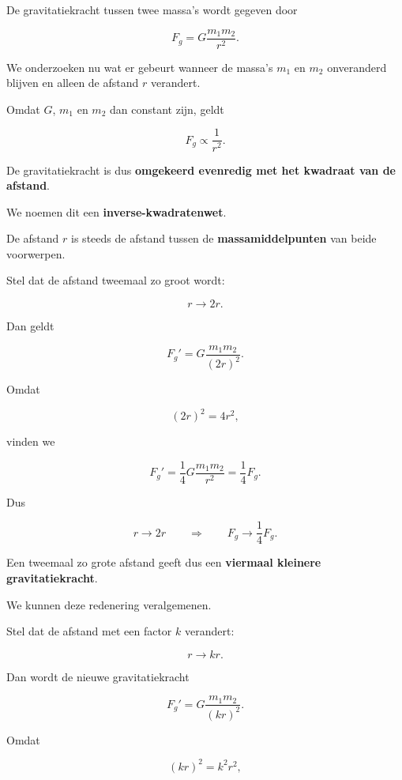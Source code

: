 \documentclass{ximera}
\begin{document}

De gravitatiekracht tussen twee massa's wordt gegeven door

\[
F_g
=
G\frac{m_1m_2}{r^2}.
\]

We onderzoeken nu wat er gebeurt wanneer de massa's $m_1$ en $m_2$
onveranderd blijven en alleen de afstand $r$ verandert.

Omdat $G$, $m_1$ en $m_2$ dan constant zijn, geldt

\[
\boxed{
F_g\propto\frac{1}{r^2}.
}
\]

De gravitatiekracht is dus \textbf{omgekeerd evenredig met het
kwadraat van de afstand}.

We noemen dit een \textbf{inverse-kwadratenwet}.

\begin{opmerking}
De afstand $r$ is steeds de afstand tussen de
\textbf{massamiddelpunten} van beide voorwerpen.
\end{opmerking}



Stel dat de afstand tweemaal zo groot wordt:

\[
r\longrightarrow2r.
\]

Dan geldt

\[
F_g'
=
G\frac{m_1m_2}{(2r)^2}.
\]

Omdat

\[
(2r)^2=4r^2,
\]

vinden we

\[
F_g'
=
\frac14
G\frac{m_1m_2}{r^2}
=
\frac14F_g.
\]

Dus

\[
\boxed{
r\longrightarrow2r
\qquad\Longrightarrow\qquad
F_g\longrightarrow\frac14F_g.
}
\]

Een tweemaal zo grote afstand geeft dus een
\textbf{viermaal kleinere gravitatiekracht}.



We kunnen deze redenering veralgemenen.

Stel dat de afstand met een factor $k$ verandert:

\[
r\longrightarrow kr.
\]

Dan wordt de nieuwe gravitatiekracht

\[
F_g'
=
G\frac{m_1m_2}{(kr)^2}.
\]

Omdat

\[
(kr)^2=k^2r^2,
\]
\end{document}
